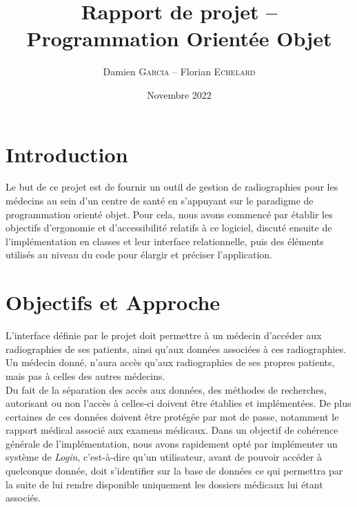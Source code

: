 \documentclass[12pt,a4paper]{article}
\begin{document}
	\title{Rapport de projet -- Programmation Orientée Objet}
	\author{Damien \textsc{Garcia} -- Florian \textsc{Echelard}}
	\date{Novembre 2022}
	
	\begin{tcolorbox}
		\maketitle		
	\end{tcolorbox}



	
	\begin{multicols}{2}

		\section{Introduction}

		Le but de ce projet est de fournir un outil de gestion de radiographies pour les médecins au sein d'un centre de santé en s'appuyant sur le paradigme de programmation orienté objet. Pour cela, nous avons commencé par établir les objectifs d'ergonomie et d'accessibilité relatifs à ce logiciel, discuté ensuite de l'implémentation en classes et leur interface relationnelle, puis des éléments utilisés au niveau du code pour élargir et préciser l'application.
		
		


		\section{Objectifs et Approche}
		
		L'interface définie par le projet doit permettre à un médecin d'accéder aux radiographies de ses patients, ainsi qu'aux données associées à ces radiographies. Un médecin donné, n'aura accès qu'aux radiographies de ses propres patients, mais pas à celles des autres médecins.\\
				
		Du fait de la séparation des accès aux données, des méthodes de recherches, autorisant ou non l'accès à celles-ci doivent être établies et implémentées. De plus certaines de ces données doivent être protégée par mot de passe, notamment le rapport médical associé aux examens médicaux. Dans un objectif de cohérence générale de l'implémentation, nous avons rapidement opté par implémenter un système de \textit{Login}, c'est-à-dire qu'un utilisateur, avant de pouvoir accéder à quelconque donnée, doit s'identifier sur la base de données ce qui permettra par la suite de lui rendre disponible uniquement les dossiers médicaux lui étant associés. \\
				

\end{multicols}
\end{document}
